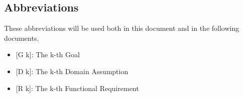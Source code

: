 \subsection{Abbreviations}
These abbreviations will be used both in this document and in the following documents.

\begin{itemize}
	\item {[}G k{]}: The k-th Goal
    \item {[}D k{]}: The k-th Domain Assumption
    \item {[}R k{]}: The k-th Functional Requirement
\end{itemize}